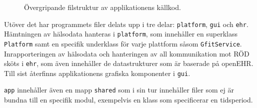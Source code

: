 \documentclass[techdoc/techdoc.tex]{subfiles}
\begin{document}
\begin{figure}[H]
    
    \caption{Övergripande filstruktur av applikationens källkod.}
    \label{fig:files}
\end{figure}

Utöver det har programmets filer delats upp i tre delar: \texttt{platform},
\texttt{gui} och \texttt{ehr}. Hämtningen av hälsodata hanteras i
\texttt{platform}, som innehåller en superklass \texttt{Platform} samt en
specifik underklass för varje plattform såsom \texttt{GfitService}.
Inrapporteringen av hälsodata och hanteringen av all kommunikation mot RÖD
sköts i \texttt{ehr}, som även innehåller de datastrukturer som är baserade på
openEHR. Till sist återfinns applikationens grafiska komponenter i
\texttt{gui}.

\texttt{app} innehåller även en mapp \texttt{shared} som i sin tur innehåller
filer som ej är bundna till en specifik modul, exempelvis en klass som
specificerar en tidsperiod.
\end{document}
